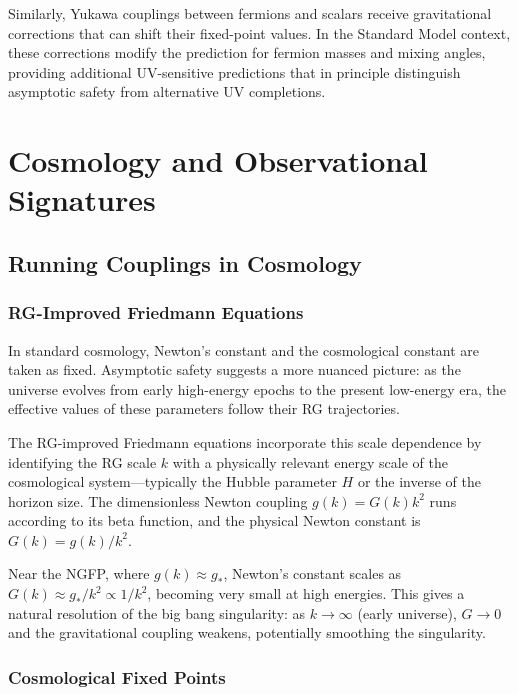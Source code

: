 \documentclass[12pt,a4paper,oneside]{book}
\theoremstyle{definition}
\theoremstyle{plain}
\theoremstyle{remark}
\begin{document}
Similarly, Yukawa couplings between fermions and scalars receive gravitational
corrections that can shift their fixed-point values. In the Standard Model
context, these corrections modify the prediction for fermion masses and
mixing angles, providing additional UV-sensitive predictions that in principle
distinguish asymptotic safety from alternative UV completions.

\part{Cosmology and Observational Signatures}

\chapter{Running Couplings in Cosmology}

\section{RG-Improved Friedmann Equations}

In standard cosmology, Newton's constant and the cosmological constant are
taken as fixed. Asymptotic safety suggests a more nuanced picture: as the
universe evolves from early high-energy epochs to the present low-energy
era, the effective values of these parameters follow their RG trajectories.

The RG-improved Friedmann equations incorporate this scale dependence by
identifying the RG scale $k$ with a physically relevant energy scale of
the cosmological system---typically the Hubble parameter $H$ or the inverse
of the horizon size. The dimensionless Newton coupling $g(k) = G(k)k^2$
runs according to its beta function, and the physical Newton constant is
$G(k) = g(k)/k^2$.

Near the NGFP, where $g(k) \approx g_*$, Newton's constant scales as
$G(k) \approx g_*/k^2 \propto 1/k^2$, becoming very small at high energies.
This gives a natural resolution of the big bang singularity: as $k \to \infty$
(early universe), $G \to 0$ and the gravitational coupling weakens, potentially
smoothing the singularity.

\section{Cosmological Fixed Points}
\end{document}
